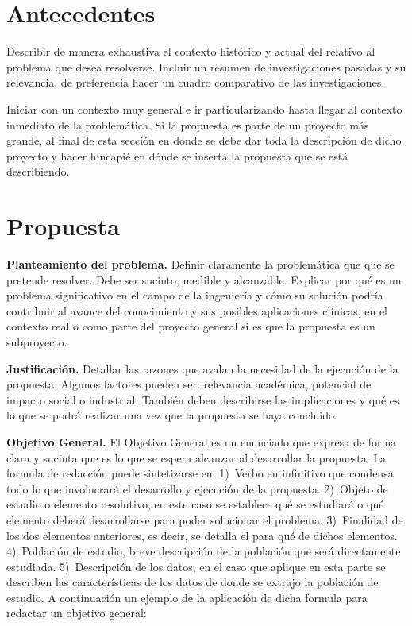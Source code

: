 \section{Antecedentes}
Describir de manera exhaustiva el contexto histórico y actual del relativo al problema que desea resolverse. Incluir un resumen de investigaciones pasadas y su relevancia, de preferencia hacer un cuadro comparativo de las investigaciones.

Iniciar con un contexto muy general e ir particularizando hasta llegar al contexto inmediato de la problemática. Si la propuesta es parte de un proyecto más grande, al final de esta sección en donde se debe dar toda la descripción de dicho proyecto y hacer hincapié en dónde se inserta la propuesta que se está describiendo.

\section{Propuesta}
\textbf{Planteamiento del problema.}
Definir claramente la problemática que que se pretende resolver. Debe ser sucinto, medible y alcanzable. Explicar por qué es un problema significativo en el campo de la ingeniería y cómo su solución podría contribuir al avance del conocimiento y sus posibles aplicaciones clínicas, en el contexto real o como parte del proyecto general si es que la propuesta es un subproyecto.

\textbf{Justificación.}
Detallar las razones que avalan la necesidad de la ejecución de la propuesta. Algunos factores pueden ser: relevancia académica, potencial de impacto social o industrial. También deben describirse las implicaciones y qué es lo que se podrá realizar una vez que la propuesta se haya concluido.

\textbf{Objetivo General.}
El Objetivo General es un enunciado que expresa de forma clara y sucinta que es lo que se espera alcanzar al desarrollar la propuesta. La formula de redacción puede sintetizarse en: 1)~Verbo en infinitivo que condensa todo lo que involucrará el desarrollo y ejecución de la propuesta. 2)~Objeto de estudio o elemento resolutivo, en este caso se establece qué se estudiará o qué elemento deberá desarrollarse para poder solucionar el problema. 3)~Finalidad de los dos elementos anteriores, es decir, se detalla el para qué de dichos elementos. 4)~Población de estudio, breve descripción de la población que será directamente estudiada. 5)~Descripción de los datos, en el caso que aplique en esta parte se describen las características de los datos de donde se extrajo la población de estudio. A continuación un ejemplo de la aplicación de dicha formula para redactar un objetivo general:


